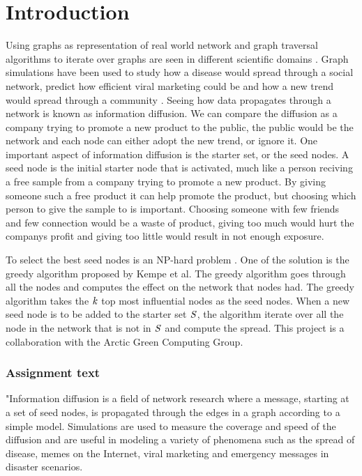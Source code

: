 \chapter{Introduction} \label{intro}

Using graphs as representation of real world network and graph traversal algorithms to iterate over graphs are seen in different scientific domains \cite{HybridBFS2015}. Graph simulations have been used to study how a disease would spread through a social network\cite{DiseasOutbreak}, predict how efficient viral marketing could be and how a new trend would spread through a community \cite{MaximizeSpread2003}. Seeing how data propagates through a network is known as information diffusion. We can compare the diffusion as a company trying to promote a new product to the public, the public would be the network and each node can either adopt the new trend, or ignore it. One important aspect of information diffusion is the starter set, or the seed nodes. A seed node is the initial starter node that is activated, much like a person reciving a free sample from a company trying to promote a new product. By giving someone such a free product it can help promote the product, but choosing which person to give the sample to is important. Choosing someone with few friends and few connection would be a waste of product, giving too much would hurt the companys profit and giving too little would result in not enough exposure.

To select the best seed nodes is an NP-hard problem \cite{MaximizeSpread2003}. One of the solution is the greedy algorithm \cite{MaximizeSpread2015} proposed by Kempe et al. The greedy algorithm goes through all the nodes and computes the effect on the network that nodes had. The greedy algorithm takes the $\it{k}$ top most influential nodes as the seed nodes. When a new seed node is to be added to the starter set $\it{S}$, the algorithm iterate over all the node in the network that is not in $\it{S}$ and compute the spread. This project is a collaboration with the Arctic Green Computing Group.

\subsection{Assignment text}
"Information diffusion is a field of network research where a message, starting at a set of seed nodes, is propagated through the edges in a graph according to a simple model. Simulations are used to measure the coverage and speed of the diffusion and are useful in modeling a variety of phenomena such as the spread of disease, memes on the Internet, viral marketing and emergency messages in disaster scenarios.

